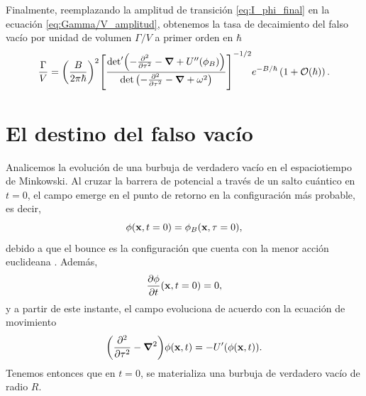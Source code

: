 Finalmente, reemplazando la amplitud de transición \eqref{eq:I_phi_final} en la ecuación \eqref{eq:Gamma/V_amplitud}, obtenemos la tasa de decaimiento del falso vacío por unidad de volumen $\Gamma/V$ a primer orden en $\hbar$
\begin{equation} \label{eq:gamma_final_V}
\frac{\Gamma}{V} = \qty(\frac{B}{2\pi\hbar})^2  \qty[ \frac{\textrm{det}' \qty(-\pdv[2]{\tau} -\grad{} + U''\qty(\phi_B) )}{\det \qty(-\pdv[2]{\tau} -\grad{} + \omega^2 )} ]^{-1/2}e^{-B/\hbar}\left( 1 + \mathcal{O}(\hbar)\right).
\end{equation}

\section{El destino del falso vacío}


Analicemos la evolución de una burbuja de verdadero vacío en el espaciotiempo de Minkowski. Al cruzar la barrera de potencial a través de un salto cuántico en $t = 0$, el campo emerge en el punto de retorno en la configuración más probable, es decir, 
\begin{equation}
	\phi\qty(\vb{x}, t = 0) =  \phi_B\qty(\vb{x}, \tau = 0),
\end{equation}
debido a que el bounce es la configuración que cuenta con la menor acción euclideana \cite{rubakov2009classical}. Además, 
\begin{equation} 
\pdv{\phi}{t}\qty(\vb{x}, t = 0) = 0,
\end{equation}
y a partir de este instante, el campo evoluciona de acuerdo con la ecuación de movimiento \cite{callan1977fate}
\begin{equation} \label{eq:eom_minkowski}
	\qty(\pdv[2]{\tau} - \grad{}^2)\phi\qty(\vb{x}, t) = -U'\qty(\phi\qty(\vb{x}, t)).
\end{equation}
Tenemos entonces que en $t = 0$, se materializa una burbuja de verdadero vacío de radio $R$. 

